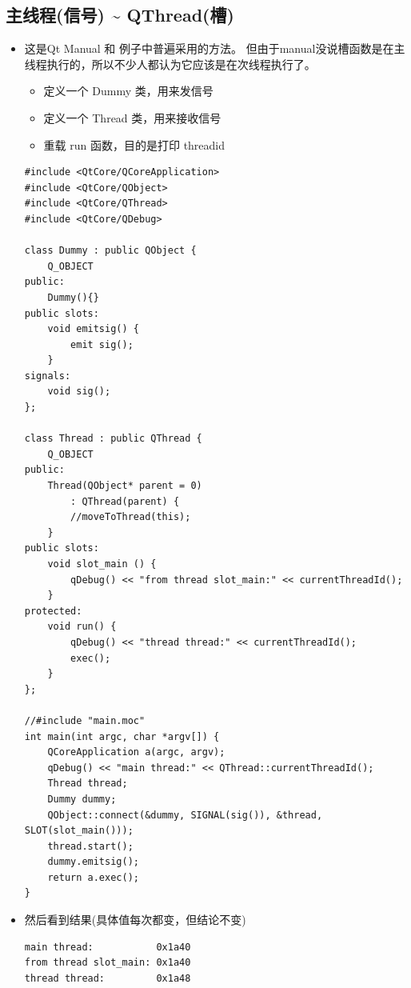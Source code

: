 \documentclass[9pt,b5paper]{article}
\begin{document}
\subsection{主线程(信号) \textasciitilde{} QThread(槽)}
\label{sec-3-3}
\begin{itemize}
\item 这是Qt Manual 和 例子中普遍采用的方法。 但由于manual没说槽函数是在主线程执行的，所以不少人都认为它应该是在次线程执行了。
\begin{itemize}
\item 定义一个 Dummy 类，用来发信号
\item 定义一个 Thread 类，用来接收信号
\item 重载 run 函数，目的是打印 threadid
\end{itemize}
\lstset{language=java,label= ,caption= ,numbers=none}
\begin{lstlisting}
#include <QtCore/QCoreApplication>   
#include <QtCore/QObject>   
#include <QtCore/QThread>   
#include <QtCore/QDebug>

class Dummy : public QObject {       
    Q_OBJECT
public:     
    Dummy(){}
public slots:
    void emitsig() {
        emit sig();       
    }
signals:
    void sig();   
};    

class Thread : public QThread {      
    Q_OBJECT
public:       
    Thread(QObject* parent = 0)
        : QThread(parent) {
        //moveToThread(this);
    }   
public slots:
    void slot_main () {           
        qDebug() << "from thread slot_main:" << currentThreadId();       
    }
protected:
    void run() {           
        qDebug() << "thread thread:" << currentThreadId();           
        exec();       
    }   
};
    
//#include "main.moc"
int main(int argc, char *argv[]) {       
    QCoreApplication a(argc, argv);       
    qDebug() << "main thread:" << QThread::currentThreadId();
    Thread thread;       
    Dummy dummy;      
    QObject::connect(&dummy, SIGNAL(sig()), &thread, SLOT(slot_main()));       
    thread.start();      
    dummy.emitsig();       
    return a.exec();
}
\end{lstlisting}
\item 然后看到结果(具体值每次都变，但结论不变)

\lstset{language=java,label= ,caption= ,numbers=none}
\begin{lstlisting}
main thread:           0x1a40 
from thread slot_main: 0x1a40 
thread thread:         0x1a48 


\end{lstlisting}
\end{itemize}
\end{document}
